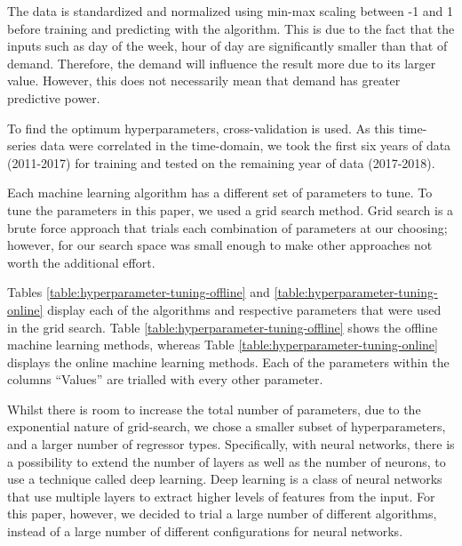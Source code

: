 \documentclass[final,3p,times,twocolumn,numbers]{elsarticle}
\begin{document}
The data is standardized and normalized using min-max scaling between -1 and 1 before training and predicting with the algorithm. This is due to the fact that the inputs such as day of the week, hour of day are significantly smaller than that of demand. Therefore, the demand will influence the result more due to its larger value. However, this does not necessarily mean that demand has greater predictive power.

 To find the optimum hyperparameters, cross-validation is used. As this time-series data were correlated in the time-domain, we took the first six years of data (2011-2017) for training and tested on the remaining year of data (2017-2018).

Each machine learning algorithm has a different set of parameters to tune. To tune the parameters in this paper, we used a grid search method. Grid search is a brute force approach that trials each combination of parameters at our choosing; however, for our search space was small enough to make other approaches not worth the additional effort.

Tables \ref{table:hyperparameter-tuning-offline} and \ref{table:hyperparameter-tuning-online} display each of the algorithms and respective parameters that were used in the grid search. Table \ref{table:hyperparameter-tuning-offline} shows the offline machine learning methods, whereas Table \ref{table:hyperparameter-tuning-online} displays the online machine learning methods. Each of the parameters within the columns ``Values'' are trialled with every other parameter.

Whilst there is room to increase the total number of parameters, due to the exponential nature of grid-search, we chose a smaller subset of hyperparameters, and a larger number of regressor types. Specifically, with neural networks, there is a possibility to extend the number of layers as well as the number of neurons, to use a technique called deep learning. Deep learning is a class of neural networks that use multiple layers to extract higher levels of features from the input. For this paper, however, we decided to trial a large number of different algorithms, instead of a large number of different configurations for neural networks.
\end{document}

